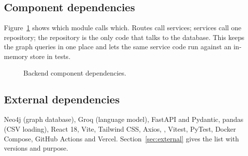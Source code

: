\subsection{Component dependencies}
Figure~\ref{fig:components} shows which module calls which. Routes call services; services call one repository; the repository is the only code that talks to the database. This keeps the graph queries in one place and lets the same service code run against an in-memory store in tests.

\begin{figure}[htb]
\centering

\caption{Backend component dependencies.}\label{fig:components}
\end{figure}

\subsection{External dependencies}
Neo4j (graph database), Groq (language model), FastAPI and Pydantic, pandas (CSV loading), React 18, Vite, Tailwind CSS, Axios, , Vitest, PyTest, Docker Compose, GitHub Actions and Vercel. Section~\ref{sec:external} gives the list with versions and purpose.

